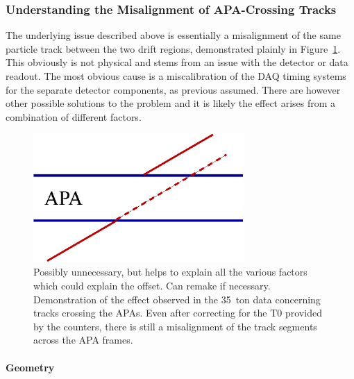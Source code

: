 
\subsubsection{Understanding the Misalignment of APA-Crossing Tracks}\label{sec:APACrossingMisalignment}

The underlying issue described above is essentially a misalignment of the same particle track between the two drift regions, demonstrated plainly in Figure~\ref{fig:TrackMisalignment}.  This obviously is not physical and stems from an issue with the detector or data readout.  The most obvious cause is a miscalibration of the DAQ timing systems for the separate detector components, as previous assumed.  There are however other possible solutions to the problem and it is likely the effect arises from a combination of different factors.

\begin{figure}
  \centering
  \includegraphics[width=8cm]{misalign_track_geo.eps}
  \caption[Demonstration of the effect observed in the 35~ton data concerning tracks crossing the APAs.]{{\color{red} Possibly unnecessary, but helps to explain all the various factors which could explain the offset. Can remake if necessary.} Demonstration of the effect observed in the 35~ton data concerning tracks crossing the APAs.  Even after correcting for the T0 provided by the counters, there is still a misalignment of the track segments across the APA frames.}
  \label{fig:TrackMisalignment}
\end{figure}

\paragraph{Geometry}

